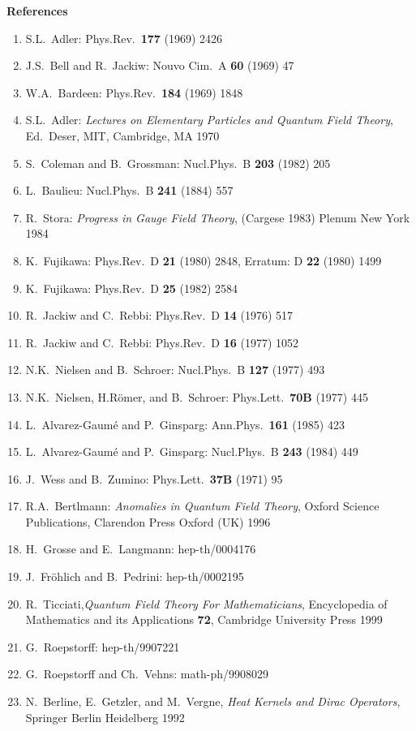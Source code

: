 \documentclass[11pt,a4paper]{article}
\begin{document}
\vspace{2cm}
{\Large\bf References}
\vspace{3mm}
\begin{enumerate}
\item S.L.\ Adler: Phys.Rev.\ {\bf 177} (1969) 2426
\item J.S.\ Bell and R.\ Jackiw: Nouvo Cim.\ A {\bf 60} (1969) 47
\item W.A.\ Bardeen: Phys.Rev.\ {\bf 184} (1969) 1848
\item S.L.\ Adler: {\em Lectures on Elementary Particles and Quantum Field
      Theory}, Ed.\ Deser, MIT, Cambridge, MA 1970
\item S.\ Coleman and B.\ Grossman: Nucl.Phys.\ B {\bf 203} (1982) 205
\item L.\ Baulieu: Nucl.Phys.\ B {\bf 241} (1884) 557
\item R.\ Stora: {\em Progress in Gauge Field Theory}, (Cargese 1983)
      Plenum New York 1984
\item K.\ Fujikawa: Phys.Rev.\ D {\bf 21} (1980) 2848, Erratum: 
      D {\bf 22} (1980) 1499
\item K.\ Fujikawa: Phys.Rev.\ D {\bf 25} (1982) 2584
\item R.\ Jackiw and C.\ Rebbi: Phys.Rev.\ D {\bf 14} (1976) 517
\item R.\ Jackiw and C.\ Rebbi: Phys.Rev.\ D {\bf 16} (1977) 1052
\item N.K.\ Nielsen and B.\ Schroer: Nucl.Phys.\ B {\bf 127} (1977) 493
\item N.K.\ Nielsen, H.R\"omer, and B.\ Schroer: Phys.Lett.\ {\bf 70B} (1977)
      445
\item L.\ Alvarez-Gaum\'e and P.\ Ginsparg: Ann.Phys.\ {\bf 161} (1985) 423
\item L.\ Alvarez-Gaum\'e and P.\ Ginsparg: Nucl.Phys.\ B {\bf 243} (1984) 449
\item J.\ Wess and B.\ Zumino: Phys.Lett.\ {\bf 37B} (1971) 95
\item R.A.\ Bertlmann: {\em Anomalies in Quantum Field Theory}, Oxford Science
      Publications, Clarendon Press Oxford (UK) 1996
\item H.\ Grosse and E.\ Langmann: hep-th/0004176
\item J.\ Fr\"ohlich and B.\ Pedrini: hep-th/0002195
\item R.\ Ticciati,{\em Quantum Field Theory For Mathematicians},
      Encyclopedia of Mathematics and its Applications {\bf 72},
      Cambridge University Press 1999
\item G.\ Roepstorff: hep-th/9907221
\item G.\ Roepstorff and Ch.\ Vehns: math-ph/9908029
\item N.\ Berline, E.\ Getzler, and M.\ Vergne, {\em Heat Kernels and
      Dirac Operators}, Springer Berlin Heidelberg 1992
\end{enumerate}
\end{document}
